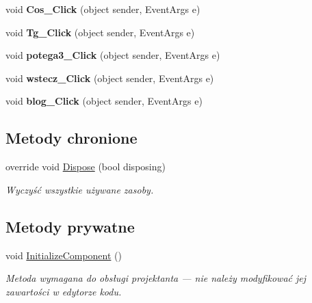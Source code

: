 \begin{DoxyCompactItemize}
\mbox{\label{classkalku__all__in__one_1_1_kalkulator_a1a6f7b6eb7f552ab6f0275d77cb77674}} 
void {\bfseries Cos\+\_\+\+Click} (object sender, Event\+Args e)
\item 
\mbox{\label{classkalku__all__in__one_1_1_kalkulator_ad7faa9056a3b60d09cc7d31889044593}} 
void {\bfseries Tg\+\_\+\+Click} (object sender, Event\+Args e)
\item 
\mbox{\label{classkalku__all__in__one_1_1_kalkulator_a727eb7b63c7316e937390df85f74aa90}} 
void {\bfseries potega3\+\_\+\+Click} (object sender, Event\+Args e)
\item 
\mbox{\label{classkalku__all__in__one_1_1_kalkulator_a07fa7270a5526187f0a5691368f8383c}} 
void {\bfseries wstecz\+\_\+\+Click} (object sender, Event\+Args e)
\item 
\mbox{\label{classkalku__all__in__one_1_1_kalkulator_ae420a6c94547bb9a7f3dc7563ad3ccd7}} 
void {\bfseries blog\+\_\+\+Click} (object sender, Event\+Args e)
\end{DoxyCompactItemize}
\subsection*{Metody chronione}
\begin{DoxyCompactItemize}
\item 
override void \mbox{\hyperlink{classkalku__all__in__one_1_1_kalkulator_a36b8f80b3fb28e7f3aed0b3a87374a17}{Dispose}} (bool disposing)
\begin{DoxyCompactList}\small\item\em Wyczyść wszystkie używane zasoby. \end{DoxyCompactList}\end{DoxyCompactItemize}
\subsection*{Metody prywatne}
\begin{DoxyCompactItemize}
\item 
void \mbox{\hyperlink{classkalku__all__in__one_1_1_kalkulator_a93058ddd473ac42a3bc101b648b0e3fe}{Initialize\+Component}} ()
\begin{DoxyCompactList}\small\item\em Metoda wymagana do obsługi projektanta — nie należy modyfikować jej zawartości w edytorze kodu. \end{DoxyCompactList}\end{DoxyCompactItemize}
